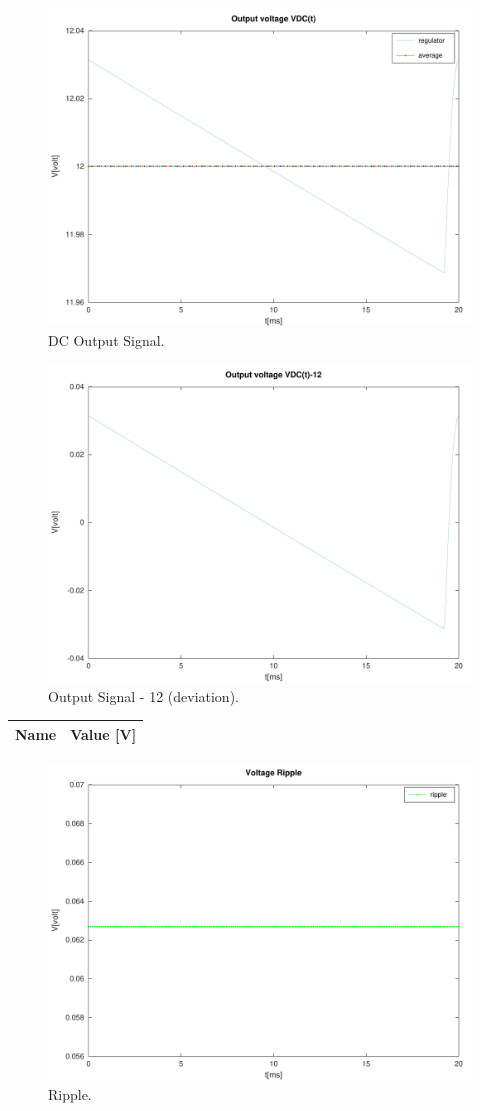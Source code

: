 \begin{figure}[H] \centering
\includegraphics[width=0.7\linewidth]{../mat/outputdc.pdf}
\caption{DC Output Signal.}
\label{fig:outputdc}
\end{figure}

\begin{figure}[H] \centering
\includegraphics[width=0.7\linewidth]{../mat/v012.pdf}
\caption{Output Signal - 12 (deviation).}
\label{fig:v012}
\end{figure}

\begin{table}[H]
  \centering
  \begin{tabular}{|l|r|}
    \hline    
    {\bf Name} & {\bf Value [V]} \\ \hline
    
  \end{tabular}
  \label{tab:ripple}
\end{table}

\begin{figure}[H] \centering
\includegraphics[width=0.7\linewidth]{../mat/ripple.pdf}
\caption{Ripple.}
\label{fig:ripplegraph}
\end{figure}